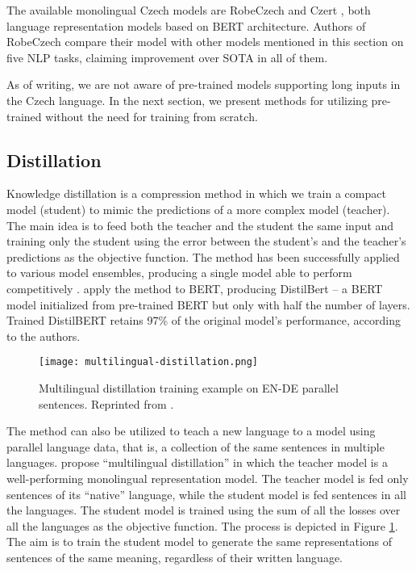The available monolingual Czech models are RobeCzech \citep{robeczech} and Czert \citep{czert}, both language representation models based on BERT architecture.
Authors of RobeCzech compare their model with other models mentioned in this section on five NLP tasks, claiming improvement over SOTA in all of them.

As of writing, we are not aware of pre-trained models supporting long inputs in the Czech language.
In the next section, we present methods for utilizing pre-trained without the need for training from scratch.

\subsection{Distillation}
\label{subsec:distillation}

Knowledge distillation \citep{kw1, kw2} is a compression method in which we train a compact model (student) to mimic the predictions of a more complex model (teacher).
The main idea is to feed both the teacher and the student the same input and training only the student using the error between the student's and the teacher's predictions as the objective function.
The method has been successfully applied to various model ensembles, producing a single model able to perform competitively \citep{kw2}. 
\citet{distilbert} apply the method to BERT, producing DistilBert -- a BERT model initialized from pre-trained BERT but only with half the number of layers.
Trained DistilBERT retains 97\% of the original model's performance, according to the authors.

\begin{figure}[!htb]
        \centering
        \texttt{[image: multilingual-distillation.png]}
        \caption[Multilingual Distillation]{Multilingual distillation training example on EN-DE parallel sentences. Reprinted from \citep{student-teacher}.}
        \label{fig:multilingual_distillation}
\end{figure}

The method can also be utilized to teach a new language to a model using parallel language data, that is, a collection of the same sentences in multiple languages.
\citet{student-teacher} propose ``multilingual distillation'' in which the teacher model is a well-performing monolingual representation model. 
The teacher model is fed only sentences of its ``native'' language, while the student model is fed sentences in all the languages. 
The student model is trained using the sum of all the losses over all the languages as the objective function.
The process is depicted in Figure \ref{fig:multilingual_distillation}.
The aim is to train the student model to generate the same representations of sentences of the same meaning, regardless of their written language.
